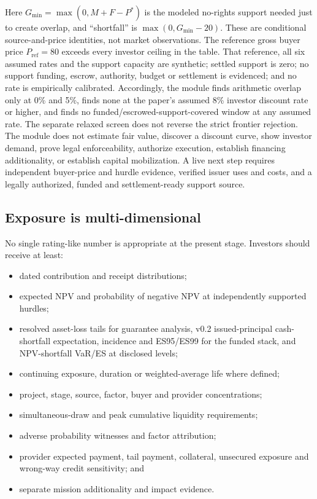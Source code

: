 \documentclass[11pt,a4paper]{article}
\begin{document}
Here \(G_{\min}=\max(0,M+F-P^*)\) is the modeled no-rights support needed just to create overlap, and ``shortfall'' is \(\max(0,G_{\min}-20)\). These are conditional source-and-price identities, not market observations. The reference gross buyer price \(P_{\mathrm{ref}}=80\) exceeds every investor ceiling in the table. That reference, all six assumed rates and the support capacity are synthetic; settled support is zero; no support funding, escrow, authority, budget or settlement is evidenced; and no rate is empirically calibrated. Accordingly, the module finds arithmetic overlap only at 0\% and 5\%, finds none at the paper's assumed 8\% investor discount rate or higher, and finds no funded/escrowed-support-covered window at any assumed rate. The separate relaxed screen does not reverse the strict frontier rejection. The module does not estimate fair value, discover a discount curve, show investor demand, prove legal enforceability, authorize execution, establish financing additionality, or establish capital mobilization. A live next step requires independent buyer-price and hurdle evidence, verified issuer uses and costs, and a legally authorized, funded and settlement-ready support source.

\subsection{Exposure is multi-dimensional}

No single rating-like number is appropriate at the present stage. Investors should receive at least:

\begin{itemize}
  \item dated contribution and receipt distributions;
  \item expected NPV and probability of negative NPV at independently supported hurdles;
  \item resolved asset-loss tails for guarantee analysis, v0.2 issued-principal cash-shortfall expectation, incidence and ES95/ES99 for the funded stack, and NPV-shortfall VaR/ES at disclosed levels;
  \item continuing exposure, duration or weighted-average life where defined;
  \item project, stage, source, factor, buyer and provider concentrations;
  \item simultaneous-draw and peak cumulative liquidity requirements;
  \item adverse probability witnesses and factor attribution;
  \item provider expected payment, tail payment, collateral, unsecured exposure and wrong-way credit sensitivity; and
  \item separate mission additionality and impact evidence.
\end{itemize}
\end{document}
